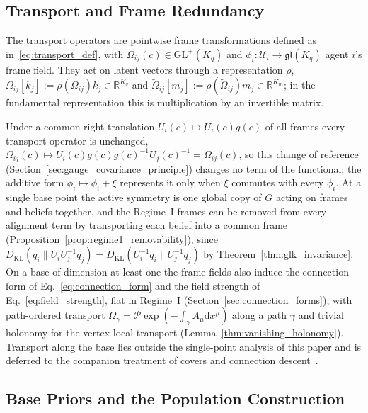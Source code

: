 \subsection{Transport and Frame Redundancy}
\label{sec:gauge_transport_arbitrary}

The transport operators are pointwise frame transformations defined as in~\eqref{eq:transport_def}, with $\Omega_{ij}(c) \in \mathrm{GL}^+(K_q)$ and $\phi_i: \mathcal{U}_i \to \mathfrak{gl}(K_q)$ agent $i$'s frame field. They act on latent vectors through a representation $\rho$, $\Omega_{ij}[k_j] := \rho(\Omega_{ij}) k_j \in \mathbb{R}^{K_q}$ and $\tilde{\Omega}_{ij}[m_j] := \rho(\tilde{\Omega}_{ij}) m_j \in \mathbb{R}^{K_m}$; in the fundamental representation this is multiplication by an invertible matrix.

Under a common right translation $U_i(c) \mapsto U_i(c) g(c)$ of all frames every transport operator is unchanged, $\Omega_{ij}(c) \mapsto U_i(c) g(c) g(c)^{-1} U_j(c)^{-1} = \Omega_{ij}(c)$, so this change of reference (Section~\ref{sec:gauge_covariance_principle}) changes no term of the functional; the additive form $\phi_i \mapsto \phi_i + \xi$ represents it only when $\xi$ commutes with every $\phi_i$. At a single base point the active symmetry is one global copy of $G$ acting on frames and beliefs together, and the Regime~I frames can be removed from every alignment term by transporting each belief into a common frame (Proposition~\ref{prop:regime1_removability}), since $D_{\mathrm{KL}}(q_i \| U_iU_j^{-1}q_j) = D_{\mathrm{KL}}(U_i^{-1}q_i \| U_j^{-1}q_j)$ by Theorem~\ref{thm:glk_invariance}. On a base of dimension at least one the frame fields also induce the connection form of Eq.~\eqref{eq:connection_form} and the field strength of Eq.~\eqref{eq:field_strength}, flat in Regime~I (Section~\ref{sec:connection_forms}), with path-ordered transport $\Omega_\gamma = \mathcal{P}\exp(-\int_\gamma A_\mu \mathrm{d}x^\mu)$ along a path $\gamma$ and trivial holonomy for the vertex-local transport (Lemma~\ref{thm:vanishing_holonomy}). Transport along the base lies outside the single-point analysis of this paper and is deferred to the companion treatment of covers and connection descent~\cite[Ch.~B4]{DennisGaugeVFESuppB2026}.

\subsection{Base Priors and the Population Construction}

